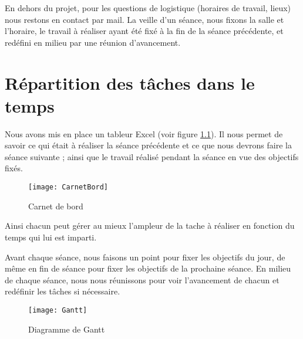 En dehors du projet, pour les questions de logistique (horaires de travail, lieux) nous restons en contact par mail. La veille d'un séance, nous fixons la salle et l'horaire, le travail à réaliser ayant été fixé à la fin de la séance précédente, et redéfini en milieu par une réunion d'avancement.  

\chapter{Répartition des tâches dans le temps}

Nous avons mis en place un tableur Excel (voir figure \ref{fig:CarnetBord}). Il nous permet de savoir ce qui était à réaliser la séance précédente et ce que nous devrons faire la séance suivante ; ainsi que le travail réalisé pendant la séance en vue des objectifs fixés. 

\begin{figure}[h]
  \centering
  \texttt{[image: CarnetBord]}
  \caption{Carnet de bord}
  \label{fig:CarnetBord}
\end{figure}

Ainsi chacun peut gérer au mieux l'ampleur de la tache à réaliser en fonction du temps qui lui est imparti.
 
Avant chaque séance, nous faisons un point pour fixer les objectifs du jour, de même en fin de séance pour fixer les objectifs de la prochaine séance. 
En milieu de chaque séance, nous nous réunissons pour voir l'avancement de chacun et redéfinir les tâches si nécessaire. 

\begin{figure}[h]
  \centering
  \texttt{[image: Gantt]}
  \caption{Diagramme de Gantt}
  \label{fig:Gantt}
\end{figure}
